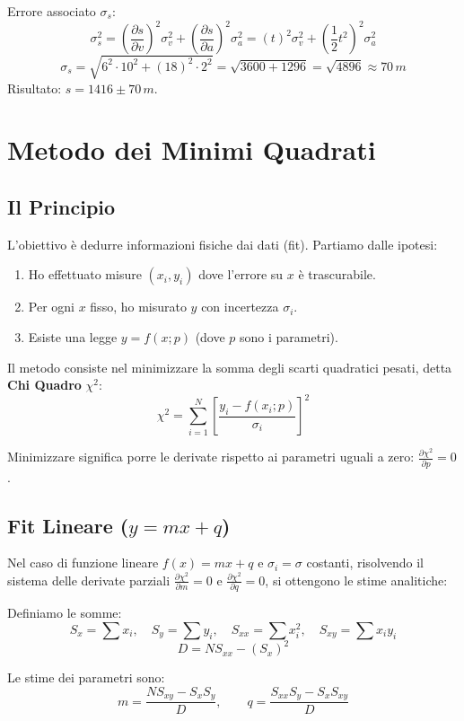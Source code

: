 \documentclass[a4paper,11pt]{article}
\theoremstyle{remark}
\begin{document}
Errore associato $\sigma_s$:
\[ \sigma_s^2 = \left( \frac{\partial s}{\partial v} \right)^2 \sigma_v^2 + \left( \frac{\partial s}{\partial a} \right)^2 \sigma_a^2 = (t)^2 \sigma_v^2 + \left(\frac{1}{2}t^2\right)^2 \sigma_a^2 \]
\[ \sigma_s = \sqrt{ 6^2 \cdot 10^2 + (18)^2 \cdot 2^2 } = \sqrt{3600 + 1296} = \sqrt{4896} \approx 70 \, m \]
Risultato: $s = 1416 \pm 70 \, m$.

\section{Metodo dei Minimi Quadrati}

\subsection{Il Principio}
L'obiettivo è dedurre informazioni fisiche dai dati (fit). Partiamo dalle ipotesi:
\begin{enumerate}
    \item Ho effettuato misure $(x_i, y_i)$ dove l'errore su $x$ è trascurabile.
    \item Per ogni $x$ fisso, ho misurato $y$ con incertezza $\sigma_i$.
    \item Esiste una legge $y = f(x; p)$ (dove $p$ sono i parametri).
\end{enumerate}

Il metodo consiste nel minimizzare la somma degli scarti quadratici pesati, detta \textbf{Chi Quadro} $\chi^2$:
\begin{equation}
    \chi^2 = \sum_{i=1}^{N} \left[ \frac{y_i - f(x_i; p)}{\sigma_i} \right]^2
\end{equation}

Minimizzare significa porre le derivate rispetto ai parametri uguali a zero: $\frac{\partial \chi^2}{\partial p} = 0$.


\subsection{Fit Lineare ($y = mx + q$)}
Nel caso di funzione lineare $f(x) = mx + q$ e $\sigma_i = \sigma$ costanti, risolvendo il sistema delle derivate parziali $\frac{\partial \chi^2}{\partial m} = 0$ e $\frac{\partial \chi^2}{\partial q} = 0$, si ottengono le stime analitiche:

Definiamo le somme:
\[ S_x = \sum x_i, \quad S_y = \sum y_i, \quad S_{xx} = \sum x_i^2, \quad S_{xy} = \sum x_i y_i \]
\[ D = N S_{xx} - (S_x)^2 \]

Le stime dei parametri sono:
\begin{equation}
    m = \frac{N S_{xy} - S_x S_y}{D}, \qquad q = \frac{S_{xx} S_y - S_x S_{xy}}{D}
\end{equation}
\end{document}
